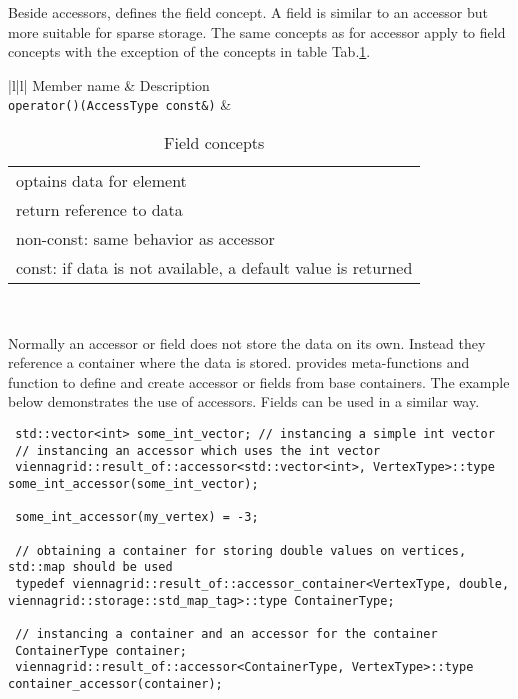 Beside accessors, {\ViennaGrid} defines the field concept. A field is similar to an accessor but more suitable for sparse storage. The same concepts as for accessor apply to field concepts with the exception of the concepts in table Tab.\ref{tab:field-concepts}.

 \begin{table}[tb]
 \begin{center}
  \begin{tabular}{|l|l|}
   \hline
   Member name & Description \\
   \hline
   \lstinline|operator()(AccessType const&)| & \begin{tabular}{l} optains data for element \\ return reference to data \\ non-const: same behavior as accessor \\ const: if data is not available, a default value is returned \end{tabular} \\
   \hline
  \end{tabular}
 \end{center}
 \caption{Field concepts}
 \label{tab:field-concepts}
 \end{table}

 Normally an accessor or field does not store the data on its own. Instead they reference a container where the data is stored. {\ViennaGrid} provides meta-functions and function to define and create accessor or fields from base containers. The example below demonstrates the use of {\ViennaGrid} accessors. Fields can be used in a similar way.

 \begin{lstlisting}
 std::vector<int> some_int_vector; // instancing a simple int vector
 // instancing an accessor which uses the int vector
 viennagrid::result_of::accessor<std::vector<int>, VertexType>::type some_int_accessor(some_int_vector);

 some_int_accessor(my_vertex) = -3;

 // obtaining a container for storing double values on vertices, std::map should be used
 typedef viennagrid::result_of::accessor_container<VertexType, double, viennagrid::storage::std_map_tag>::type ContainerType;

 // instancing a container and an accessor for the container
 ContainerType container;
 viennagrid::result_of::accessor<ContainerType, VertexType>::type container_accessor(container);
\end{lstlisting}
